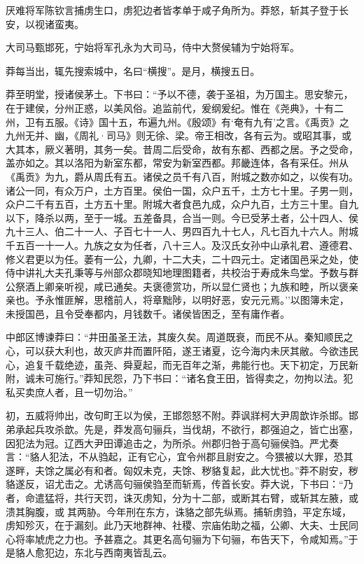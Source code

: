 \documentclass[]{article}
\begin{document}
厌难将军陈钦言捕虏生口，虏犯边者皆孝单于咸子角所为。莽怒，斩其子登于长安，以视诸蛮夷。

大司马甄邯死，宁始将军孔永为大司马，侍中大赘侯辅为宁始将军。

莽每当出，辄先搜索城中，名曰``横搜''。是月，横搜五日。

莽至明堂，授诸侯茅土。下书曰：``予以不德，袭于圣祖，为万国主。思安黎元，在于建侯，分州正惑，以美风俗。追监前代，爰纲爰纪。惟在《尧典》，十有二州，卫有五服。《诗》国十五，布遍九州。《殷颂》有`奄有九有'之言。《禹贡》之九州无并、幽，《周礼·司马》则无徐、梁。帝王相改，各有云为。或昭其事，或大其本，厥义著明，其务一矣。昔周二后受命，故有东都、西都之居。予之受命，盖亦如之。其以洛阳为新室东都，常安为新室西都。邦畿连体，各有采任。州从《禹贡》为九，爵从周氏有五。诸侯之员千有八百，附城之数亦如之，以俟有功。诸公一同，有众万户，土方百里。侯伯一国，众户五千，土方七十里。子男一则，众户二千有五百，土方五十里。附城大者食邑九成，众户九百，土方三十里。自九以下，降杀以两，至于一城。五差备具，合当一则。今已受茅土者，公十四人、侯九十三人、伯二十一人、子百七十一人、男四百九十七人，凡七百九十六人。附城千五百一十一人。九族之女为任者，八十三人。及汉氏女孙中山承礼君、遵德君、修义君更以为任。萎有一公，九卿，十二大夫，二十四元士。定诸国邑采之处，使侍中讲礼大夫孔秉等与州部众郡晓知地理图籍者，共校治于寿成朱鸟堂。予数与群公祭酒上卿亲听视，咸已通矣。夫褒德赏功，所以显仁贤也；九族和睦，所以褒亲亲也。予永惟匪解，思稽前人，将章黜陟，以明好恶，安元元焉。''以图簿未定，未授国邑，且令受奉都内，月钱数千。诸侯皆困乏，至有庸作者。

中郎区博谏莽曰：``井田虽圣王法，其废久矣。周道既衰，而民不从。秦知顺民之心，可以获大利也，故灭庐井而置阡陌，遂王诸夏，讫今海内未厌其敝。今欲违民心，追复千载绝迹，虽尧、舜夏起，而无百年之渐，弗能行也。天下初定，万民新附，诚未可施行。''莽知民怨，乃下书曰：``诸名食王田，皆得卖之，勿拘以法。犯私买卖庶人者，且一切勿治。''

初，五威将帅出，改句町王以为侯，王邯怨怒不附。莽讽牂柯大尹周歆诈杀邯。邯弟承起兵攻杀歆。先是，莽发高句骊兵，当伐胡，不欲行，郡强迫之，皆亡出塞，因犯法为冠。辽西大尹田谭追击之，为所杀。州郡归咎于高句骊侯驺。严尤奏言：``貉人犯法，不从驺起，正有它心，宜令州郡且尉安之。今猥被以大罪，恐其遂畔，夫馀之属必有和者。匈奴未克，夫馀、秽貉复起，此大忧也。''莽不尉安，秽貉遂反，诏尤击之。尤诱高句骊侯驺至而斩焉，传首长安。莽大说，下书曰：``乃者，命遣猛将，共行天罚，诛灭虏知，分为十二部，或断其右臂，或斩其左腋，或溃其胸腹，或其两胁。今年刑在东方，诛貉之部先纵焉。捕斩虏驺，平定东域，虏知殄灭，在于漏刻。此乃天地群神、社稷、宗庙佑助之福，公卿、大夫、士民同心将率虓虎之力也。予甚嘉之。其更名高句骊为下句骊，布告天下，令咸知焉。''于是貉人愈犯边，东北与西南夷皆乱云。
\end{document}
